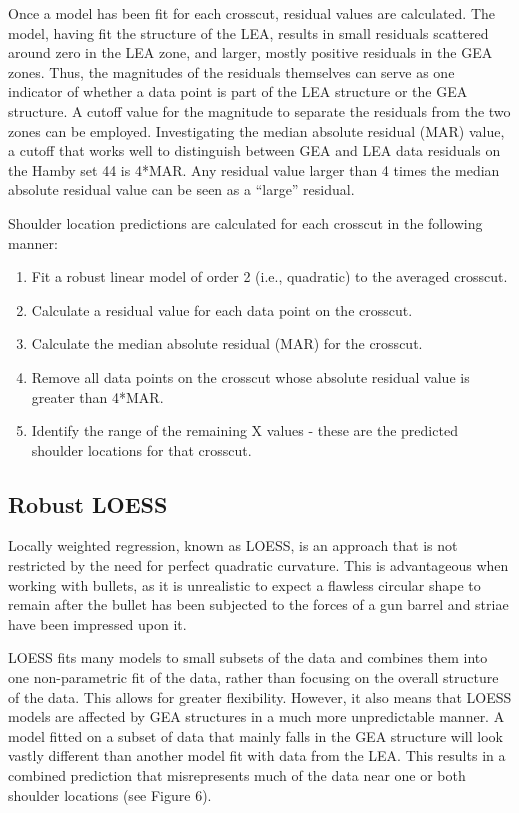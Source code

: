 \documentclass[12pt]{article}
\begin{document}
Once a model has been fit for each crosscut, residual values are
calculated. The model, having fit the structure of the LEA, results in
small residuals scattered around zero in the LEA zone, and larger,
mostly positive residuals in the GEA zones. Thus, the magnitudes of the
residuals themselves can serve as one indicator of whether a data point
is part of the LEA structure or the GEA structure. A cutoff value for
the magnitude to separate the residuals from the two zones can be
employed. Investigating the median absolute residual (MAR) value, a
cutoff that works well to distinguish between GEA and LEA data residuals
on the Hamby set 44 is 4*MAR. Any residual value larger than 4 times the
median absolute residual value can be seen as a ``large'' residual.

Shoulder location predictions are calculated for each crosscut in the
following manner:\\

\begin{enumerate}
\item Fit a robust linear model of order 2 (i.e., quadratic) to the averaged crosscut.   
\item Calculate a residual value for each data point on the crosscut.  
\item Calculate the median absolute residual (MAR) for the crosscut.  
\item Remove all data points on the crosscut whose absolute residual value is greater than 4*MAR.  
\item Identify the range of the remaining X values - these are the predicted shoulder locations for that crosscut.   
\end{enumerate}

\subsection{Robust LOESS}

Locally weighted regression, known as LOESS, is an approach that is not
restricted by the need for perfect quadratic curvature. This is
advantageous when working with bullets, as it is unrealistic to expect a
flawless circular shape to remain after the bullet has been subjected to
the forces of a gun barrel and striae have been impressed upon it.

LOESS fits many models to small subsets of the data and combines them
into one non-parametric fit of the data, rather than focusing on the
overall structure of the data. This allows for greater flexibility.
However, it also means that LOESS models are affected by GEA structures
in a much more unpredictable manner. A model fitted on a subset of data
that mainly falls in the GEA structure will look vastly different than
another model fit with data from the LEA. This results in a combined
prediction that misrepresents much of the data near one or both shoulder
locations (see Figure 6).
\end{document}
